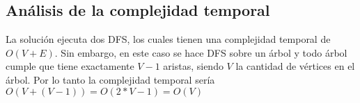 \documentclass[a4paper,10pt]{article}
\begin{document}
	\subsection{Análisis de la complejidad temporal}
	La soluci\'on ejecuta dos DFS, los cuales tienen una complejidad temporal de $O(V + E)$. Sin embargo, en este caso se hace DFS sobre un \'arbol y todo \'arbol cumple que tiene exactamente $V - 1$ aristas, siendo $V$ la cantidad de v\'ertices en el \'arbol. Por lo tanto la complejidad temporal ser\'ia $O(V + (V - 1)) = O(2*V - 1) = O(V)$
\end{document}
